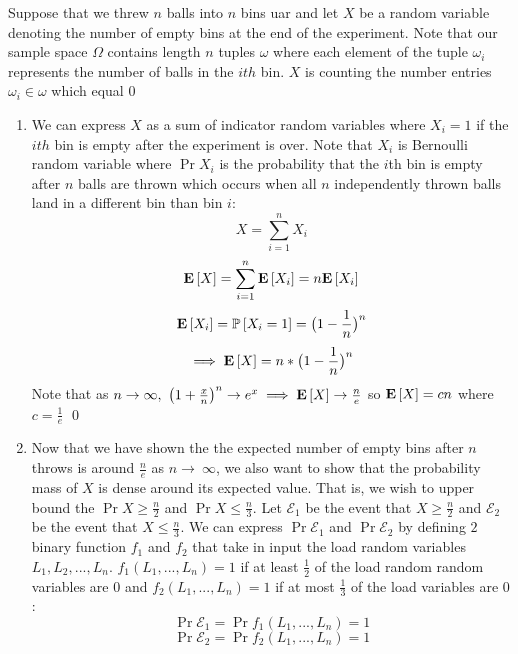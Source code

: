 \documentclass[12pt]{article}
\begin{document}
\begin{solution}
Suppose that we threw $n$ balls into $n$ bins uar and let $X$ be a random variable denoting the number of empty bins at the end of the experiment. Note that our sample space $\Omega$ contains length $n$ tuples $\omega$ where each element of the tuple $\omega_i$ represents the number of balls in the $ith$ bin. $X$ is counting the number entries $\omega_i \in \omega$ which equal $0$
\begin{enumerate}[label=(\alph*)]
    \item We can express $X$ as a sum of indicator random variables where $X_i=1$ if the $ith$ bin is empty after the experiment is over. Note that $X_i$ is Bernoulli random variable where $\Pr{X_i}$ is the probability that the $i$th bin is empty after $n$ balls are thrown which occurs when all $n$ independently thrown balls land in a different bin than bin $i$:
\[
X = \sum_{i=1}^{n}{X_i}
\]
\[
\mathbf{E}\left[X\right] = \sum_{i=1}^{n}{\mathbf{E}\left[X_i\right]} = n\mathbf{E}\left[X_i\right]
\]
\[
\mathbf{E}\left[X_i\right] = \mathbb{P}\left[X_i = 1\right] = \big(1-\frac{1}{n}\big)^n
\]
\[
\implies \mathbf{E}\left[X\right] = n * \big(1-\frac{1}{n}\big)^n
\]
Note that as $n \rightarrow \infty, ~\big(1 + \frac{x}{n}\big)^n \rightarrow e^x \implies \mathbf{E}\left[X\right] \rightarrow \frac{n}{e}$ so $\mathbf{E}\left[X\right] = cn$ where $c = \frac{1}{e}$ \qed
\item Now that we have shown the the expected number of empty bins after $n$ throws is around $\frac{n}{e}$ as $n\rightarrow~\infty$, we also want to show that the probability mass of $X$ is dense around its expected value. That is, we wish to upper bound the $\Pr{X \geq \frac{n}{2}}$ and $\Pr{X \leq \frac{n}{3}}$. Let $\mathcal{E}_1$ be the event that $X \geq \frac{n}{2}$ and $\mathcal{E}_2$ be the event that $X \leq \frac{n}{3}$. We can express $\Pr{\mathcal{E}_1}$ and $\Pr{\mathcal{E}_2}$ by defining $2$ binary function $f_1$ and $f_2$ that take in input the load random variables $L_1,L_2, ..., L_n$. $f_{1}(L_1, ..., L_n) = 1$ if at least $\frac{1}{2}$ of the load random random variables are $0$ and $f_{2}(L_1, ..., L_n) = 1$ if at most $\frac{1}{3}$ of the load variables are $0$:
\[
\Pr{\mathcal{E}_1} = \Pr{f_{1}(L_1, ..., L_n)=1}
\]
\[
\Pr{\mathcal{E}_2} = \Pr{f_{2}(L_1, ..., L_n)=1}
\]

\end{enumerate}
\end{solution}
\end{document}
